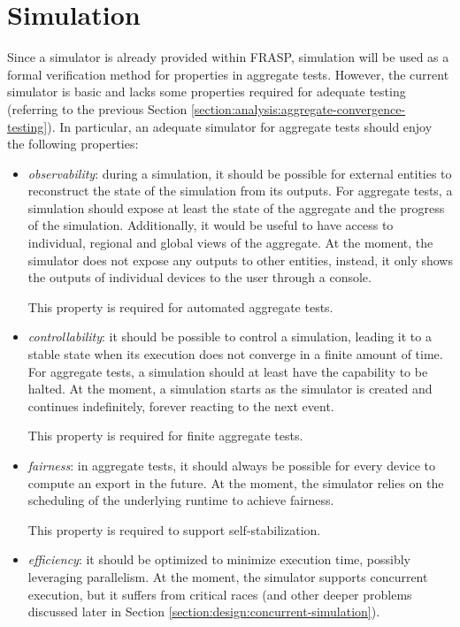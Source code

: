 
\section{Simulation}
\label{section:analysis:simulation}

Since a simulator is already provided within FRASP, simulation will be used as
a formal verification method for properties in aggregate tests. However, the
current simulator is basic and lacks some properties required for adequate
testing (referring to the previous Section
\ref{section:analysis:aggregate-convergence-testing}). In particular, an
adequate simulator for aggregate tests should enjoy the following properties:
\begin{itemize}
  \item \textit{observability}: during a simulation, it should be possible for
        external entities to reconstruct the state of the simulation from its
        outputs. For aggregate tests, a simulation should expose at least the
        state of the aggregate and the progress of the simulation. Additionally,
        it would be useful to have access to individual, regional and global
        views of the aggregate. At the moment, the simulator does not expose
        any outputs to other entities, instead, it only shows the outputs of
        individual devices to the user through a console.

        This property is required for automated aggregate tests.
  \item \textit{controllability}: it should be possible to control a
        simulation, leading it to a stable state when its execution does not
        converge in a finite amount of time. For aggregate tests, a simulation
        should at least have the capability to be halted. At the moment, a
        simulation starts as the simulator is created and continues
        indefinitely, forever reacting to the next event.

        This property is required for finite aggregate tests.
  \item \textit{fairness}: in aggregate tests, it should always be possible for
        every device to compute an export in the future. At the moment, the
        simulator relies on the scheduling of the underlying runtime to achieve
        fairness.

        This property is required to support self-stabilization.
  \item \textit{efficiency}: it should be optimized to minimize execution time,
        possibly leveraging parallelism. At the moment, the simulator supports
        concurrent execution, but it suffers from critical races (and other
        deeper problems discussed later in Section
        \ref{section:design:concurrent-simulation}).


\end{itemize}
